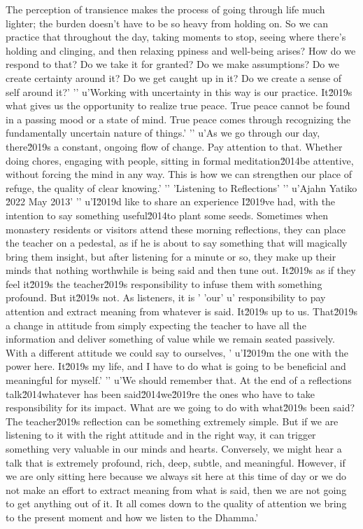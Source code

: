 The perception of transience makes the process of going through life 
much lighter; the burden doesn't have to be so heavy from holding on. 
So we can practice that throughout the day, taking moments to stop, 
seeing where there's holding and clinging, and then relaxing ppiness and well-being arises? How do we respond to that? Do we take it for granted? Do we make assumptions? Do we create certainty around it? Do we get caught up in it? Do we create a sense of self around it?'
'\n'
u'Working with uncertainty in this way is our practice. It\u2019s what gives us the opportunity to realize true peace. True peace cannot be found in a passing mood or a state of mind. True peace comes through recognizing the fundamentally uncertain nature of things.'
'\n'
u'As we go through our day, there\u2019s a constant, ongoing flow of change. Pay attention to that. Whether doing chores, engaging with people, sitting in formal meditation\u2014be attentive, without forcing the mind in any way. This is how we can strengthen our place of refuge, the quality of clear knowing.'
'\n'
'Listening to Reflections'
'\n'
u'Ajahn Yatiko \u2022 May 2013'
'\n'
u'I\u2019d like to share an experience I\u2019ve had, with the intention to say something useful\u2014to plant some seeds. Sometimes when monastery residents or visitors attend these morning reflections, they can place the teacher on a pedestal, as if he is about to say something that will magically bring them insight, but after listening for a minute or so, they make up their minds that nothing worthwhile is being said and then tune out. It\u2019s as if they feel it\u2019s the teacher\u2019s responsibility to infuse them with something profound. But it\u2019s not. As listeners, it is '
'our'
u' responsibility to pay attention and extract meaning from whatever is said. It\u2019s up to us. That\u2019s a change in attitude from simply expecting the teacher to have all the information and deliver something of value while we remain seated passively. With a different attitude we could say to ourselves, '
u'I\u2019m the one with the power here. It\u2019s my life, and I have to do what is going to be beneficial and meaningful for myself.'
'\n'
u'We should remember that. At the end of a reflections talk\u2014whatever has been said\u2014we\u2019re the ones who have to take responsibility for its impact. What are we going to do with what\u2019s been said? The teacher\u2019s reflection can be something extremely simple. But if we are listening to it with the right attitude and in the right way, it can trigger something very valuable in our minds and hearts. Conversely, we might hear a talk that is extremely profound, rich, deep, subtle, and meaningful. However, if we are only sitting here because we always sit here at this time of day or we do not make an effort to extract meaning from what is said, then we are not going to get anything out of it. It all comes down to the quality of attention we bring to the present moment and how we listen to the Dhamma.'
